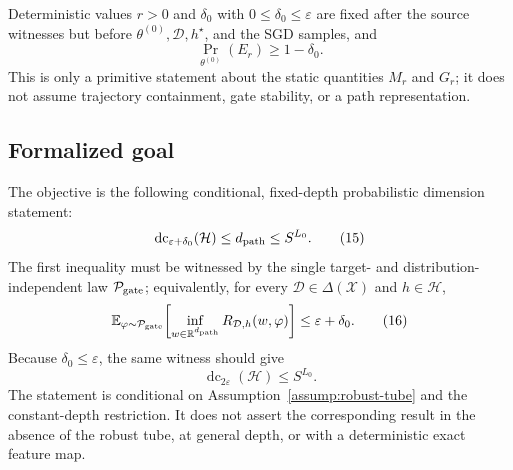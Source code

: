 \begin{assumption}
\label{assump:robust-tube}
Deterministic values $r>0$ and $\delta_0$ with
$0\leq\delta_0\leq\varepsilon$ are fixed after the source witnesses but
before $\theta^{(0)},\mathcal D,h^\star$, and the SGD samples, and
\[
\Pr_{\theta^{(0)}}(E_r)\geq1-\delta_0.
\tag{14}\label{eq:p1-i3-eq014}
\]
This is only a primitive statement about the static quantities $M_r$ and
$G_r$; it does not assume trajectory containment, gate stability, or a path
representation.
\end{assumption}

\subsection{Formalized goal}

The objective is the following conditional, fixed-depth probabilistic
dimension statement:
\[
\operatorname{dc}_{\varepsilon+\delta_0}(\mathcal H)
\leq d_{\rm path}\leq S^{L_0}.
\tag{15}\label{eq:p1-i3-eq015}
\]
The first inequality must be witnessed by the single target- and
distribution-independent law $\mathcal P_{\rm gate}$; equivalently, for every
$\mathcal D\in\Delta(\mathcal X)$ and $h\in\mathcal H$,
\[
\mathbb E_{\varphi\sim\mathcal P_{\rm gate}}\!\left[
\inf_{w\in\mathbb R^{d_{\rm path}}}
R_{\mathcal D,h}(w,\varphi)
\right]\leq\varepsilon+\delta_0.
\tag{16}\label{eq:p1-i3-eq016}
\]
Because $\delta_0\leq\varepsilon$, the same witness should give
\[
\operatorname{dc}_{2\varepsilon}(\mathcal H)\leq S^{L_0}.
\tag{17}\label{eq:p1-i3-eq017}
\]
The statement is conditional on Assumption~\ref{assump:robust-tube} and the
constant-depth restriction.  It does not assert the corresponding result in
the absence of the robust tube, at general depth, or with a deterministic
exact feature map.
